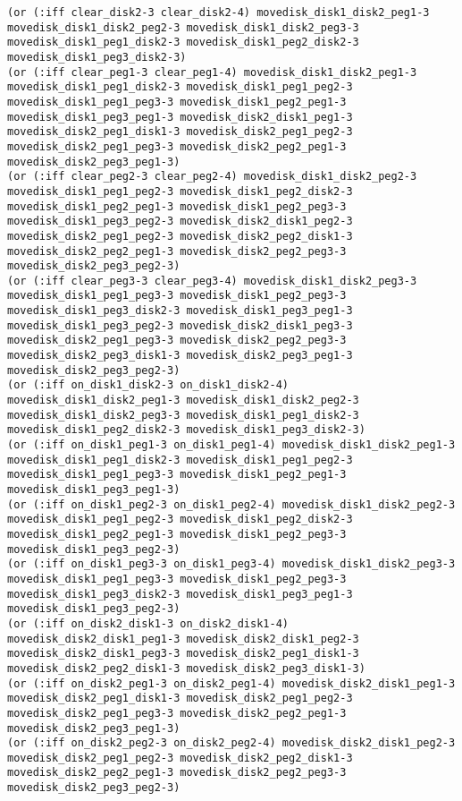 \documentclass[12pt,letterpaper]{ntdhw}
\begin{document}
\begin{enumerate}
\begin{enumerate}
\begin{lstlisting}[language=pddl, style=pddlstyle,
  basicstyle=\scriptsize]
(or (:iff clear_disk2-3 clear_disk2-4) movedisk_disk1_disk2_peg1-3 movedisk_disk1_disk2_peg2-3 movedisk_disk1_disk2_peg3-3 movedisk_disk1_peg1_disk2-3 movedisk_disk1_peg2_disk2-3 movedisk_disk1_peg3_disk2-3)
(or (:iff clear_peg1-3 clear_peg1-4) movedisk_disk1_disk2_peg1-3 movedisk_disk1_peg1_disk2-3 movedisk_disk1_peg1_peg2-3 movedisk_disk1_peg1_peg3-3 movedisk_disk1_peg2_peg1-3 movedisk_disk1_peg3_peg1-3 movedisk_disk2_disk1_peg1-3 movedisk_disk2_peg1_disk1-3 movedisk_disk2_peg1_peg2-3 movedisk_disk2_peg1_peg3-3 movedisk_disk2_peg2_peg1-3 movedisk_disk2_peg3_peg1-3)
(or (:iff clear_peg2-3 clear_peg2-4) movedisk_disk1_disk2_peg2-3 movedisk_disk1_peg1_peg2-3 movedisk_disk1_peg2_disk2-3 movedisk_disk1_peg2_peg1-3 movedisk_disk1_peg2_peg3-3 movedisk_disk1_peg3_peg2-3 movedisk_disk2_disk1_peg2-3 movedisk_disk2_peg1_peg2-3 movedisk_disk2_peg2_disk1-3 movedisk_disk2_peg2_peg1-3 movedisk_disk2_peg2_peg3-3 movedisk_disk2_peg3_peg2-3)
(or (:iff clear_peg3-3 clear_peg3-4) movedisk_disk1_disk2_peg3-3 movedisk_disk1_peg1_peg3-3 movedisk_disk1_peg2_peg3-3 movedisk_disk1_peg3_disk2-3 movedisk_disk1_peg3_peg1-3 movedisk_disk1_peg3_peg2-3 movedisk_disk2_disk1_peg3-3 movedisk_disk2_peg1_peg3-3 movedisk_disk2_peg2_peg3-3 movedisk_disk2_peg3_disk1-3 movedisk_disk2_peg3_peg1-3 movedisk_disk2_peg3_peg2-3)
(or (:iff on_disk1_disk2-3 on_disk1_disk2-4) movedisk_disk1_disk2_peg1-3 movedisk_disk1_disk2_peg2-3 movedisk_disk1_disk2_peg3-3 movedisk_disk1_peg1_disk2-3 movedisk_disk1_peg2_disk2-3 movedisk_disk1_peg3_disk2-3)
(or (:iff on_disk1_peg1-3 on_disk1_peg1-4) movedisk_disk1_disk2_peg1-3 movedisk_disk1_peg1_disk2-3 movedisk_disk1_peg1_peg2-3 movedisk_disk1_peg1_peg3-3 movedisk_disk1_peg2_peg1-3 movedisk_disk1_peg3_peg1-3)
(or (:iff on_disk1_peg2-3 on_disk1_peg2-4) movedisk_disk1_disk2_peg2-3 movedisk_disk1_peg1_peg2-3 movedisk_disk1_peg2_disk2-3 movedisk_disk1_peg2_peg1-3 movedisk_disk1_peg2_peg3-3 movedisk_disk1_peg3_peg2-3)
(or (:iff on_disk1_peg3-3 on_disk1_peg3-4) movedisk_disk1_disk2_peg3-3 movedisk_disk1_peg1_peg3-3 movedisk_disk1_peg2_peg3-3 movedisk_disk1_peg3_disk2-3 movedisk_disk1_peg3_peg1-3 movedisk_disk1_peg3_peg2-3)
(or (:iff on_disk2_disk1-3 on_disk2_disk1-4) movedisk_disk2_disk1_peg1-3 movedisk_disk2_disk1_peg2-3 movedisk_disk2_disk1_peg3-3 movedisk_disk2_peg1_disk1-3 movedisk_disk2_peg2_disk1-3 movedisk_disk2_peg3_disk1-3)
(or (:iff on_disk2_peg1-3 on_disk2_peg1-4) movedisk_disk2_disk1_peg1-3 movedisk_disk2_peg1_disk1-3 movedisk_disk2_peg1_peg2-3 movedisk_disk2_peg1_peg3-3 movedisk_disk2_peg2_peg1-3 movedisk_disk2_peg3_peg1-3)
(or (:iff on_disk2_peg2-3 on_disk2_peg2-4) movedisk_disk2_disk1_peg2-3 movedisk_disk2_peg1_peg2-3 movedisk_disk2_peg2_disk1-3 movedisk_disk2_peg2_peg1-3 movedisk_disk2_peg2_peg3-3 movedisk_disk2_peg3_peg2-3)

\end{lstlisting}
\end{enumerate}
\end{enumerate}
\end{document}
